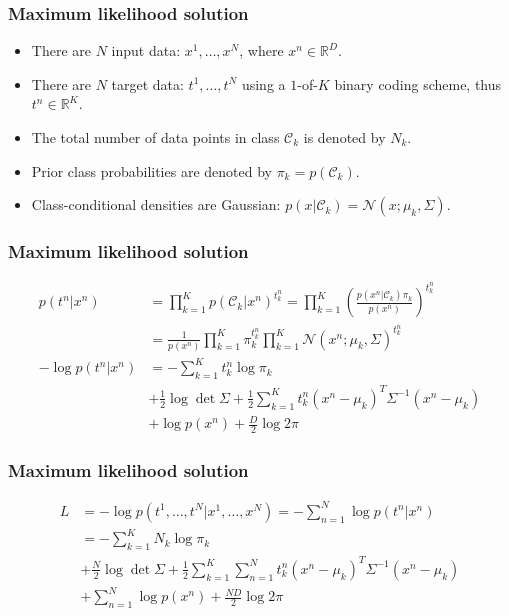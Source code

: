 \documentclass{beamer}
\begin{document}
\begin{frame}
    \frametitle{Maximum likelihood solution}
    \begin{itemize}
        \item There are $N$ input data: $x^{1},\hdots,x^{N}$, where $x^{n}\in\mathbb{R}^{D}$.
        \item There are $N$ target data: $t^{1},\hdots,t^{N}$ using a $1$-of-$K$ binary coding scheme, thus $t^{n}\in\mathbb{R}^{K}$.
        \item The total number of data points in class $\mathcal{C}_{k}$ is denoted by $N_{k}$.
        \item Prior class probabilities are denoted by $\pi_{k}=p(\mathcal{C}_{k})$.
        \item Class-conditional densities are Gaussian: $p(x|\mathcal{C}_{k})=\mathcal{N}(x;\mu_{k},\Sigma)$.
    \end{itemize}
\end{frame}

\begin{frame}
    \frametitle{Maximum likelihood solution}
    \begin{align*}
        p(t^{n}|x^{n})&=\prod_{k=1}^{K}p(\mathcal{C}_{k}|x^{n})^{t^{n}_{k}}=\prod_{k=1}^{K}(\frac{p(x^{n}|\mathcal{C}_{k})\pi_{k}}{p(x^{n})})^{t^{n}_{k}} \\
        &=\frac{1}{p(x^{n})}\prod_{k=1}^{K}\pi_{k}^{t^{n}_{k}}\prod_{k=1}^{K}\mathcal{N}(x^{n};\mu_{k},\Sigma)^{t^{n}_{k}} \\
        -\log{}p(t^{n}|x^{n})&=-\sum_{k=1}^{K}t^{n}_{k}\log\pi_{k} \\
        &+\frac{1}{2}\log\det\Sigma+\frac{1}{2}\sum_{k=1}^{K}t^{n}_{k}(x^{n}-\mu_{k})^{T}\Sigma^{-1}(x^{n}-\mu_{k}) \\
        &+\log{}p(x^{n})+\frac{D}{2}\log{}2\pi
    \end{align*}
\end{frame}

\begin{frame}
    \frametitle{Maximum likelihood solution}
    \begin{align*}
        L&=-\log{}p(t^{1},\hdots,t^{N}|x^{1},\hdots,x^{N})=-\sum_{n=1}^{N}\log{}p(t^{n}|x^{n}) \\
        &=-\sum_{k=1}^{K}N_{k}\log\pi_{k} \\
        &+\frac{N}{2}\log\det\Sigma+\frac{1}{2}\sum_{k=1}^{K}\sum_{n=1}^{N}t^{n}_{k}(x^{n}-\mu_{k})^{T}\Sigma^{-1}(x^{n}-\mu_{k}) \\
        &+\sum_{n=1}^{N}\log{}p(x^{n})+\frac{ND}{2}\log{}2\pi
    \end{align*}
\end{frame}
\end{document}
